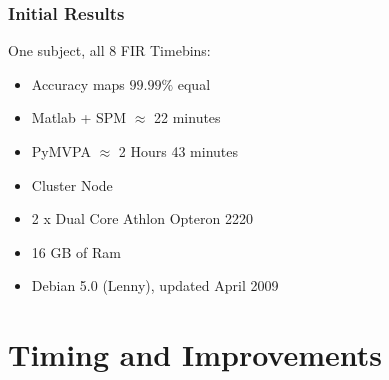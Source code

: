 \begin{frame}
 \frametitle{Initial Results}
  


One subject, all 8 FIR Timebins:

\begin{itemize}
  \item Accuracy maps $99.99\%$ equal
  \item Matlab + SPM  $\approx$ 22 minutes
  \item PyMVPA $\approx$ 2 Hours 43 minutes
\end{itemize}

\begin{itemize}
  \item Cluster Node
  \item 2 x Dual Core Athlon Opteron 2220
  \item 16 GB of Ram
  \item Debian 5.0 (Lenny), updated April 2009
\end{itemize}

  
 \end{frame}

\section{Timing and Improvements}



